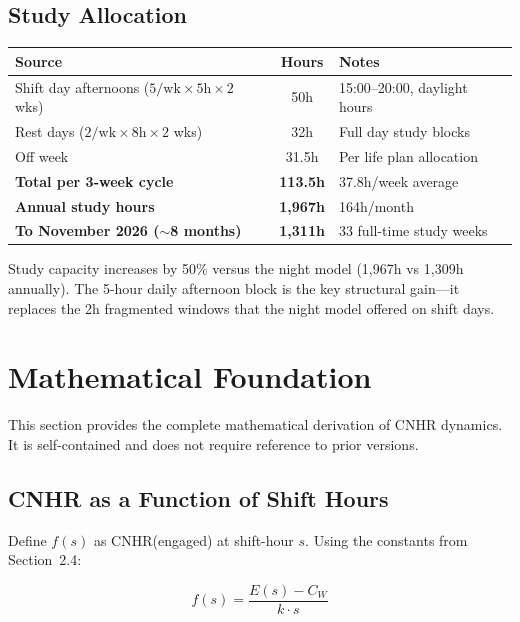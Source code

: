 \documentclass[a4paper,11pt]{article}
\begin{document}
\subsection{Study Allocation}

\begin{tabularx}{\textwidth}{X C l}
\toprule
\textbf{Source} & \textbf{Hours} & \textbf{Notes} \\
\midrule
Shift day afternoons ($5/\text{wk} \times 5\text{h} \times 2$ wks) & 50h & 15:00--20:00, daylight hours \\
Rest days ($2/\text{wk} \times 8\text{h} \times 2$ wks) & 32h & Full day study blocks \\
Off week & 31.5h & Per life plan allocation \\
\midrule
{} \textbf{Total per 3-week cycle} & \textbf{113.5h} & 37.8h/week average \\
\textbf{Annual study hours} & \textbf{1,967h} & 164h/month \\
 \textbf{To November 2026 ($\sim$8 months)} & \textbf{1,311h} & 33 full-time study weeks \\
\bottomrule
\end{tabularx}

\medskip
Study capacity increases by 50\% versus the night model (1,967h vs 1,309h annually). The 5-hour daily afternoon block is the key structural gain---it replaces the 2h fragmented windows that the night model offered on shift days.

\newpage

\section{Mathematical Foundation}

This section provides the complete mathematical derivation of CNHR dynamics. It is self-contained and does not require reference to prior versions.

\subsection{CNHR as a Function of Shift Hours}

Define $f(s)$ as CNHR(engaged) at shift-hour $s$. Using the constants from Section~2.4:

\begin{equation}
f(s) = \frac{E(s) - C_W}{k \cdot s}
\end{equation}
\end{document}
